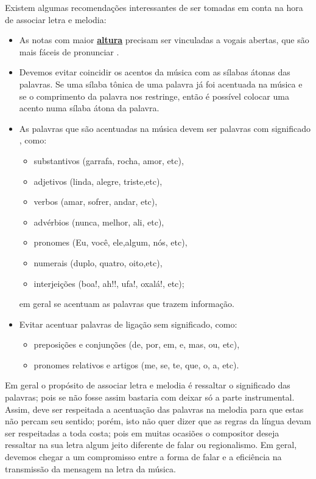 Existem algumas recomendações interessantes de ser tomadas em conta na hora de associar letra e melodia:
\begin{itemize}
\item As notas com maior \hyperref[sec:pos:Altura]{\textbf{altura}} precisam ser vinculadas a vogais abertas,
 que são mais fáceis de pronunciar \cite[pp. 61]{howard1991aprendendo}.
\item Devemos evitar coincidir os acentos da música com as sílabas átonas das palavras.
Se uma sílaba tônica de uma palavra já foi acentuada na música 
e se o comprimento da palavra nos restringe,
então é possível colocar uma acento numa sílaba átona da palavra. 
\item As palavras que são acentuadas na música devem ser palavras com significado \cite[pp. 61]{howard1991aprendendo},
como:
\begin{itemize}
\item substantivos (garrafa, rocha, amor, etc), 
\item adjetivos (linda, alegre, triste,etc), 
\item verbos (amar, sofrer, andar, etc), 
\item advérbios (nunca, melhor, ali, etc), 
\item pronomes (Eu, você, ele,algum,  nós, etc), 
\item numerais (duplo, quatro, oito,etc), 
\item interjeições (boa!, ah!!, ufa!, oxalá!, etc); 
\end{itemize}
em geral se acentuam as palavras que trazem informação.
\item Evitar acentuar palavras de ligação sem significado, como: 
\begin{itemize}
\item preposições e conjunções (de, por, em, e, mas, ou, etc),
\item pronomes relativos e artigos (me, se, te, que, o, a, etc).
\end{itemize}
\end{itemize}



Em geral o propósito de associar letra e melodia é ressaltar o significado das palavras;
pois se não fosse assim bastaria com deixar só a parte instrumental.
Assim, deve ser respeitada a acentuação das palavras na melodia para que estas não percam seu sentido;
porém, isto não quer dizer que as regras da língua devam ser respeitadas a toda costa; 
pois em muitas ocasiões o compositor deseja ressaltar na sua letra algum jeito diferente de falar ou regionalismo. 
Em geral, devemos chegar a um compromisso entre a forma de falar e 
a eficiência na transmissão da mensagem na letra da música.



